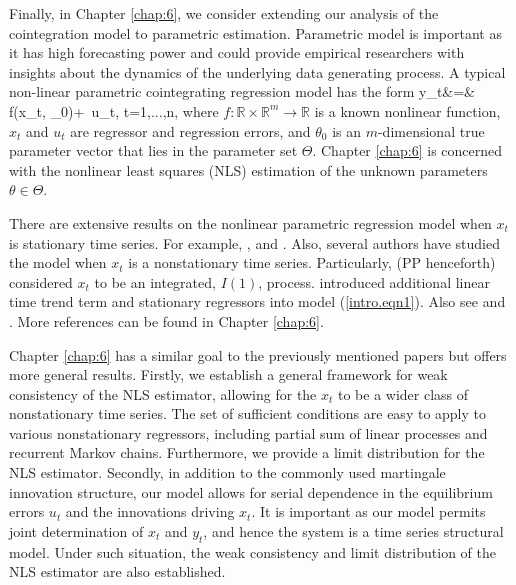 Finally, in Chapter \ref{chap:6}, we consider extending our analysis of the cointegration model to parametric estimation. Parametric model is important as it has high forecasting power and could provide empirical researchers with insights about the dynamics of the underlying data generating process. A typical non-linear parametric cointegrating regression model has the form
 \be y_t&=&
f(x_t, \theta_0)+\,  u_t, \quad t=1,...,n,
\ee
where  $f:\mathbb{R} \times \mathbb{R}^m \rightarrow \mathbb{R}$ is a known nonlinear function,
$x_t$ and  $u_t$ are regressor and regression errors, and   $\theta_0$ is an $m$-dimensional true parameter vector that lies in the parameter set $\Theta$. Chapter \ref{chap:6} is concerned with the nonlinear least squares (NLS) estimation of the unknown parameters $\theta\in \Theta$.

 There are extensive results on the nonlinear parametric regression model when $x_t$ is stationary time series. For example, \cite{jennrich1969}, \cite{malinvaud1970} and \cite{wu1981}. Also, several authors have studied the model when $x_t$ is a nonstationary time series. Particularly, \cite{parkphillips2001} (PP henceforth) considered $x_t$ to be an integrated, $I(1)$, process. \cite{changparkphillips2001} introduced additional linear time trend term and stationary regressors into model (\ref{intro.eqn1}). Also see \cite{changpark2010} and \cite{shiphillips2010}. More references can be found in Chapter \ref{chap:6}.

Chapter \ref{chap:6} has a similar goal to the previously mentioned papers but offers more general results. Firstly, we establish a general framework for  weak consistency of the NLS estimator, allowing for the $x_t$ to be  a  wider class of nonstationary time series. The set of sufficient conditions are easy to apply to various nonstationary regressors, including partial sum of linear processes and recurrent Markov chains. Furthermore, we  provide a limit distribution for the NLS estimator. Secondly, in addition to the commonly used martingale innovation structure, our model allows for serial dependence in the equilibrium errors $u_t$ and the innovations driving $x_t$. It is important as our model  permits joint determination of $x_t$ and $y_t$, and hence the system is a time series structural model. Under such situation, the weak consistency and limit distribution of the NLS estimator are also established.





